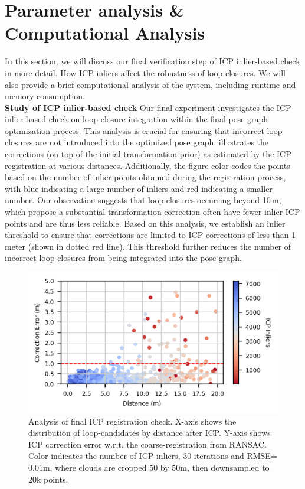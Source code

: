 \section{Parameter analysis \& Computational Analysis}
In this section, we will discuss our final verification step of ICP inlier-based check in more detail. How ICP inliers affect the robustness of loop closures. We will also provide a brief computational analysis of the system, including runtime and memory consumption.\\
\newline
\textbf{Study of ICP inlier-based check}\hspace{0.5em} Our final experiment investigates the ICP inlier-based check on loop closure integration within the final pose graph optimization process. This analysis is crucial for ensuring that incorrect loop closures are not introduced into the optimized pose graph.
 illustrates the corrections (on top of the initial transformation prior) as estimated by the ICP registration at various distances. Additionally, the figure color-codes the points based on the number of inlier points obtained during the registration process, with blue indicating a large number of inliers and red indicating a smaller number.
Our observation suggests that loop closures occurring beyond 10\,m, which propose a substantial transformation correction often have fewer inlier ICP points and are thus less reliable.
Based on this analysis, we establish an inlier threshold to ensure that corrections are limited to ICP corrections of less than 1 meter (shown in dotted red line). This threshold further reduces the number of incorrect loop closures from being integrated into the pose graph.\\
\begin{figure}[t]
  \centering
  \includegraphics[width=0.99\linewidth]{pics/exp_4_ablation_icp_inliers_4cm}
  \caption{Analysis of final ICP registration check. X-axis shows the distribution of loop-candidates by distance after ICP.
  Y-axis shows ICP correction error w.r.t. the coarse-registration from RANSAC. Color indicates the number of ICP inliers,  30 iterations and RMSE= 0.01m, where clouds are cropped 50 by 50m, then downsampled to 20k points.}
  \label{fig:icp_inliers}
\end{figure}
